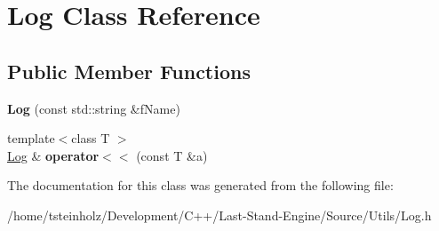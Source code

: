 \hypertarget{classLog}{}\section{Log Class Reference}
\label{classLog}
\subsection*{Public Member Functions}
\begin{DoxyCompactItemize}
\item 
\hypertarget{classLog_a0a319aee4f9b3df2d33b58ebd6f16240}{}{\bfseries Log} (const std\+::string \&f\+Name)\label{classLog_a0a319aee4f9b3df2d33b58ebd6f16240}

\item 
\hypertarget{classLog_ad86b6d7390d3ffcb86e8b5eea46748f0}{}{\footnotesize template$<$class T $>$ }\\\hyperlink{classLog}{Log} \& {\bfseries operator$<$$<$} (const T \&a)\label{classLog_ad86b6d7390d3ffcb86e8b5eea46748f0}

\end{DoxyCompactItemize}


The documentation for this class was generated from the following file\+:\begin{DoxyCompactItemize}
\item 
/home/tsteinholz/\+Development/\+C++/\+Last-\/\+Stand-\/\+Engine/\+Source/\+Utils/Log.\+h\end{DoxyCompactItemize}
